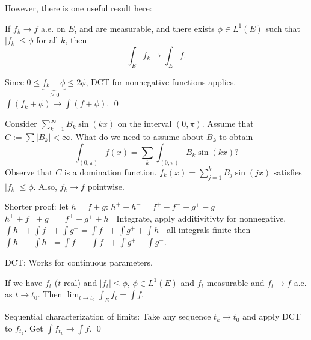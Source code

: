 However, there is one useful result here:

\begin{thm}
If $f_k \to f$ a.e. on $E$, and are measurable, and there exists $\phi \in L^1(E)$ such that $|f_k| \leq \phi$ for all $k$, then
	\[
	\int_E f_k \longrightarrow \int_E f.
	\]
\end{thm}


\pf Since $0 \leq \underbrace{f_k+\phi}_{\geq 0} \leq 2 \phi$, DCT for nonnegative functions applies. $\int (f_k+\phi) \to \int (f+\phi)$. \qed \\


\begin{ex}
Consider $\sum_{k=1}^\infty B_k \sin(kx)$ on the interval $(0,\pi)$. Assume that $C:=\sum |B_k|<\infty$. What do we need to assume about $B_k$ to obtain
	\[
	\int_{(0,\pi)} f(x) = \sum_k \int_{(0,\pi)} B_k \sin(kx)?
	\] 
Observe that $C$ is a domination function. $f_k(x) = \sum_{j=1}^k B_j \sin(jx)$ satisfies $|f_k| \leq \phi$. Also, $f_k \to f$ pointwise. 

\end{ex}













Shorter proof: let $h= f+g$:
$h^+ - h^-= f^+ - f^- + g^+ - g^-$
$h^+ + f^- + g^-= f^+ + g^+ + h^-$
Integrate, apply additivitivty for nonnegative.
$\int h^+ + \int f^- + \int g^-= \int f^+ + \int g^+ + \int h^-$
all integrals finite then 
$\int h^+ - \int h^- = \int f^+ - \int f^- + \int g^+ - \int g^-$. 



DCT: Works for continuous parameters.

If we have $f_t$ ($t$ real) and $|f_t| \leq \phi$, $\phi \in L^1(E)$ and $f_t$ measurable and $f_t \to f$ a.e. as $t \to t_0$. Then $\lim_{t \to t_0} \int_E f_t= \int f$. 

\pf Sequential characterization of limits: Take any sequence $t_k \to t_0$ and apply DCT to $f_{t_k}$. Get $\int f_{t_k} \to \int f$. \qed \\


